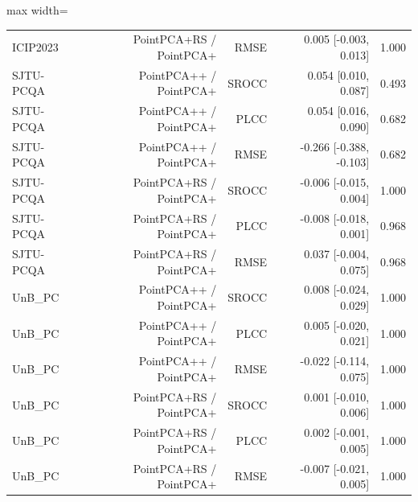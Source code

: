\documentclass[final,3p,times,twocolumn]{elsarticle}
\begin{document}
\begin{table}[t!]
\begin{adjustbox}{max width=\textwidth}
\begin{tabular}{lrrrr}
        ICIP2023 & PointPCA+RS / PointPCA+ & RMSE & 0.005 [-0.003, 0.013] & 1.000 \\
        SJTU-PCQA & PointPCA++ / PointPCA+ & SROCC & 0.054 [0.010, 0.087] & 0.493 \\
        SJTU-PCQA & PointPCA++ / PointPCA+ & PLCC & 0.054 [0.016, 0.090] & 0.682 \\
        SJTU-PCQA & PointPCA++ / PointPCA+ & RMSE & -0.266 [-0.388, -0.103] & 0.682 \\
        SJTU-PCQA & PointPCA+RS / PointPCA+ & SROCC & -0.006 [-0.015, 0.004] & 1.000 \\
        SJTU-PCQA & PointPCA+RS / PointPCA+ & PLCC & -0.008 [-0.018, 0.001] & 0.968 \\
        SJTU-PCQA & PointPCA+RS / PointPCA+ & RMSE & 0.037 [-0.004, 0.075] & 0.968 \\
        UnB\_PC & PointPCA++ / PointPCA+ & SROCC & 0.008 [-0.024, 0.029] & 1.000 \\
        UnB\_PC & PointPCA++ / PointPCA+ & PLCC & 0.005 [-0.020, 0.021] & 1.000 \\
        UnB\_PC & PointPCA++ / PointPCA+ & RMSE & -0.022 [-0.114, 0.075] & 1.000 \\
        UnB\_PC & PointPCA+RS / PointPCA+ & SROCC & 0.001 [-0.010, 0.006] & 1.000 \\
        UnB\_PC & PointPCA+RS / PointPCA+ & PLCC & 0.002 [-0.001, 0.005] & 1.000 \\
        UnB\_PC & PointPCA+RS / PointPCA+ & RMSE & -0.007 [-0.021, 0.005] & 1.000 \\
        \bottomrule
        \end{tabular}
    \end{adjustbox}
\end{table}
\end{document}

